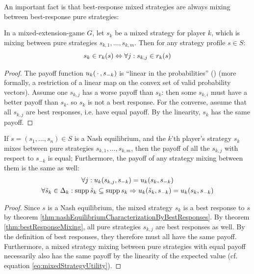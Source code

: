 \documentclass[a4paper]{scrreprt}
\begin{document}
    An important fact is that best-response mixed strategies are always mixing between best-response pure strategies:

    \begin{thm}
        \label{thm:bestResponseMixing}
        In a mixed-extension-game $G$,
        let $s_k$ be a mixed strategy for player $k$, which is mixing between pure strategies $s_{k,1}, \dots, s_{k,m}$.
        Then for any strategy profile $s \in S$:
        \[
            s_k \in r_k(s) \Leftrightarrow \forall j: s_{k, j} \in r_k(s)
        \]
    \end{thm}
    \begin{proof}
        The payoff function $u_k(\,\cdot\,, s_{-k})$ is “linear in the probabilities” (\cite[p.11]{bib:fudenbergGameTheory})
        (more formally, a restriction of a linear map on the convex set of valid probability vectors).
        Assume one $s_{k, j}$ has a worse payoff than $s_k$: then some $s_{k, i}$ must have a better payoff than $s_k$. so $s_k$ is not a best response.
        For the converse, assume that all $ s_{k, j} $ are best responses, i.e. have equal payoff. By the linearity, $s_k$ has the same payoff.
    \end{proof}

    \begin{cor}
        \label{cor:equilibriumStrategiesSupportHaveEqualPayoffs}
        If $s = (s_1, \dots, s_n) \in S$ is a Nash equilibrium, and the $k$'th player's strategy $s_k$
        mixes between pure strategies $s_{k,1}, \dots, s_{k,m}$, then the payoff of all the $s_{k,j}$ with respect to $s_{-k}$ is equal;
        Furthermore, the payoff of any strategy mixing between them is the same as well:
        \begin{gather}
            \forall j: u_k(s_{k,j}, s_{-k}) = u_k(s_k, s_{-k}) \\
            \forall \tilde{s}_k \in \Delta_k: \operatorname{supp} \tilde{s}_k \subseteq \operatorname{supp} s_k \Rightarrow u_k(\tilde{s}_k, s_{-k}) = u_k(s_k, s_{-k})
        \end{gather}
    \end{cor}
    \begin{proof}
        Since $s$ is a Nash equilibrium, the mixed strategy $s_k$ is a best response to $s$ by theorem \ref{thm:nashEquilibriumCharacterizationByBestResponses}.
        By theorem \ref{thm:bestResponseMixing}, all pure strategies $s_{k, j}$ are best responses as well.
        By the definition of best responses, they therefore must all have the same payoff.
        Furthermore, a mixed strategy mixing between pure strategies with equal payoff necessarily also has the same payoff by the linearity of the expected value (cf. equation \eqref{eq:mixedStrategyUtility}).
    \end{proof}
    
\end{document}
